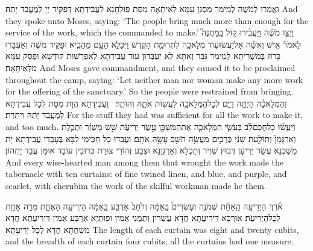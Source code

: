 {וַאֲמַרוּ לְמֹשֶׁה לְמֵימַר מַסְגַּן עַמָּא לְאֵיתָאָה מִסַּת פּוּלְחָנָא לַעֲבִידְתָא דְּפַקֵּיד יְיָ לְמֶעֱבַד יָתַהּ׃}
{And they spoke unto Moses, saying: ‘The people bring much more than enough for the service of the work, which the \lord\space commanded to make.’}{}
{וַיְצַ֣ו מֹשֶׁ֗ה וַיַּעֲבִ֨ירוּ ק֥וֹל בַּֽמַּחֲנֶה֮ לֵאמֹר֒ אִ֣ישׁ וְאִשָּׁ֗ה אַל\maqqaf יַעֲשׂוּ\maqqaf ע֛וֹד מְלָאכָ֖ה לִתְרוּמַ֣ת הַקֹּ֑דֶשׁ וַיִּכָּלֵ֥א הָעָ֖ם מֵהָבִֽיא׃}
{וּפַקֵּיד מֹשֶׁה וְאַעְבַּרוּ כָּרוֹז בְּמַשְׁרִיתָא לְמֵימַר גְּבַר וְאִתָּא לָא יַעְבְּדוּן עוֹד עֲבִידְתָא לְאַפְרָשׁוּת קוּדְשָׁא וּפְסַק עַמָּא מִלְּאֵיתָאָה׃}
{And Moses gave commandment, and they caused it to be proclaimed throughout the camp, saying: ‘Let neither man nor woman make any more work for the offering of the sanctuary.’ So the people were restrained from bringing.}{}
{וְהַמְּלָאכָ֗ה הָיְתָ֥ה דַיָּ֛ם לְכׇל\maqqaf הַמְּלָאכָ֖ה לַעֲשׂ֣וֹת אֹתָ֑הּ וְהוֹתֵֽר׃ \setuma }
{וַעֲבִידְתָא הֲוָת מִסַּת לְכָל עֲבִידְתָא לְמֶעֱבַד יָתַהּ וִיתַרַת׃}
{For the stuff they had was sufficient for all the work to make it, and too much.}{}
{וַיַּעֲשׂ֨וּ כׇל\maqqaf חֲכַם\maqqaf לֵ֜ב בְּעֹשֵׂ֧י הַמְּלָאכָ֛ה אֶת\maqqaf הַמִּשְׁכָּ֖ן עֶ֣שֶׂר יְרִיעֹ֑ת שֵׁ֣שׁ מׇשְׁזָ֗ר וּתְכֵ֤לֶת וְאַרְגָּמָן֙ וְתוֹלַ֣עַת שָׁנִ֔י כְּרֻבִ֛ים מַעֲשֵׂ֥ה חֹשֵׁ֖ב עָשָׂ֥ה אֹתָֽם׃}
{וַעֲבַדוּ כָל חַכִּימֵי לִבָּא בְּעָבְדֵי עֲבִידְתָא יָת מַשְׁכְּנָא עֲשַׂר יְרִיעָן דְּבוּץ שְׁזִיר וְתַכְלָא וְאַרְגְּוָנָא וּצְבַע זְהוֹרִי צוּרַת כְּרוּבִין עוֹבָד אוּמָּן עֲבַד יָתְהוֹן׃}
{And every wise-hearted man among them that wrought the work made the tabernacle with ten curtains: of fine twined linen, and blue, and purple, and scarlet, with cherubim the work of the skilful workman made he them.}{}

{אֹ֜רֶךְ הַיְרִיעָ֣ה הָֽאַחַ֗ת שְׁמֹנֶ֤ה וְעֶשְׂרִים֙ בָּֽאַמָּ֔ה וְרֹ֙חַב֙ אַרְבַּ֣ע בָּֽאַמָּ֔ה הַיְרִיעָ֖ה הָאֶחָ֑ת מִדָּ֥ה אַחַ֖ת לְכׇל\maqqaf הַיְרִיעֹֽת׃}
{אוּרְכָּא דִּירִיעֲתָא חֲדָא עֶשְׂרִין וְתַמְנֵי אַמִּין וּפוּתְיָא אַרְבַּע אַמִּין דִּירִיעֲתָא חֲדָא מִשְׁחֲתָא חֲדָא לְכָל יְרִיעָתָא׃}
{The length of each curtain was eight and twenty cubits, and the breadth of each curtain four cubits; all the curtains had one measure.}{}

